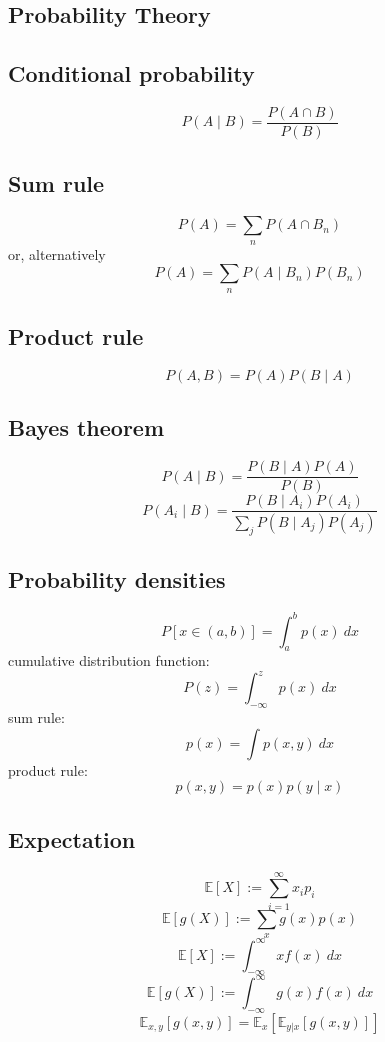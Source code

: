 \documentclass{article}
\begin{document}
\begin{multicols}{2}


\section{Probability Theory}

\subsection{Conditional probability}
\[P(A \mid B) = \frac{P(A \cap B)}{P(B)}\]

\subsection{Sum rule}
\[P(A)=\sum_n P(A \cap B_n)\]
or, alternatively
\[P(A)=\sum_n P(A \mid B_n) P(B_n)\]

\subsection{Product rule}
\[P(A, B) = P(A) P(B \mid A)\]

\subsection{Bayes theorem}
\[P(A \mid B) = \frac{P(B \mid A) P(A)}{P(B)}\]
\[P(A_i \mid B) = \frac{P(B \mid A_i) P(A_i)}{\sum\limits_j P(B \mid A_j) P(A_j)}\]

\subsection{Probability densities}
\[P[x \in (a, b)] = \int_a^b p(x)\ dx\]
cumulative distribution function:
\[P(z) = \int_{-\infty}^z p(x)\ dx\]
sum rule:
\[p(x) = \int p(x, y)\ dx\]
product rule:
\[p(x, y) = p(x) p(y \mid x)\]

\subsection{Expectation}
\[\mathbb{E}[X] := \sum_{i=1}^\infty x_i p_i\]
\[\mathbb{E}[g(X)] := \sum_{x} g(x) p(x)\]
\[\mathbb{E}[X] := \int_{-\infty}^\infty x f(x)\ dx\]
\[\mathbb{E}[g(X)] := \int_{-\infty}^\infty g(x) f(x)\ dx\]
\[\mathbb{E}_{x, y}\left[g(x, y)\right] = \mathbb{E}_x\left[\mathbb{E}_{y|x}[g(x, y)]\right]\]


\end{multicols}
\end{document}
